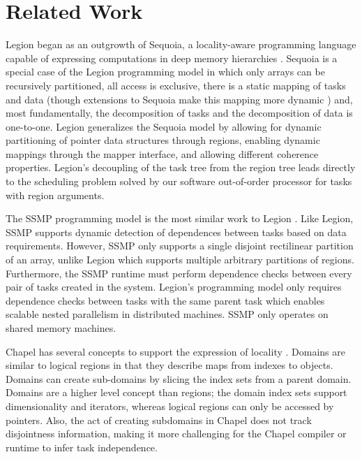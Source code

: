 
\section{Related Work}
\label{sec:related}

Legion began as an outgrowth of Sequoia, a locality-aware programming language capable
of expressing computations in deep memory hierarchies
\cite{Fatahalian06}.  Sequoia is a special case of the Legion
programming model in which only arrays can be recursively partitioned,
all access is exclusive, there is a static mapping of tasks and data (though
extensions to Sequoia make this mapping more dynamic \cite{BCSA11}) and, most 
fundamentally, the decomposition of tasks and the decomposition
of data is one-to-one.  Legion generalizes the Sequoia model by allowing for
dynamic partitioning of pointer data structures through regions, enabling dynamic mappings through
the mapper interface, and allowing different coherence
properties.  Legion's decoupling of the task tree from the region tree leads directly to the scheduling problem solved by our software out-of-order processor for tasks with region arguments.

The SSMP programming model is the most similar work to Legion \cite{Perez10}.  
Like Legion, SSMP supports dynamic detection of dependences between tasks based 
on data requirements.  However, SSMP only supports a single disjoint rectilinear 
partition of an array, unlike Legion which supports multiple
arbitrary partitions of regions.  Furthermore, the SSMP runtime must perform dependence
checks between every pair of tasks created in the system.  Legion's programming model only
requires dependence checks between tasks with the same parent task which enables scalable nested
parallelism in distributed machines.  SSMP only operates on shared memory machines.

Chapel has several concepts to support the expression of locality \cite{Chamberlain:Chapel}.
Domains are similar to logical regions in that they describe maps from indexes
to objects.  Domains can create sub-domains by slicing the index sets from
a parent domain.  Domains are a higher level concept than regions; the domain index sets 
support dimensionality and iterators, whereas logical regions can only be accessed by pointers.  
Also, the act of creating subdomains in Chapel does not track disjointness information,
making it more challenging for the Chapel compiler or runtime to infer task independence.


